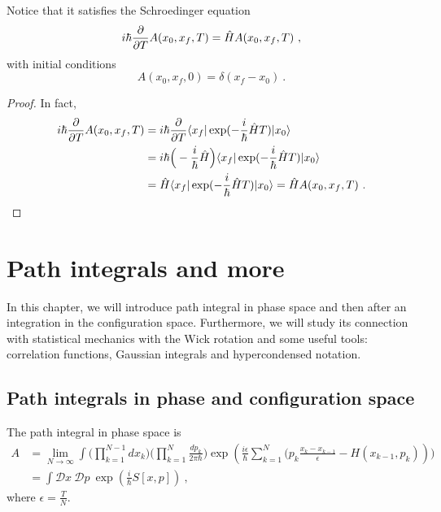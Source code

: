     Notice that it satisfies the Schroedinger equation 
    \begin{equation*}
        i \hbar \frac{\partial}{\partial T} A (x_0, x_f, T) = \hat H A (x_0, x_f, T) ~,
    \end{equation*}
    with initial conditions
    \begin{equation*}
        A (x_0, x_f, 0) = \delta (x_f - x_0) ~.
    \end{equation*}
    \begin{proof}
        In fact,
        \begin{equation*}
        \begin{aligned}
            i \hbar \frac{\partial}{\partial T} A (x_0, x_f, T) & = i \hbar \frac{\partial}{\partial T} \langle x_f\vert \exp(- \frac{i}{\hbar} \hat H T) \vert x_0\rangle \\ & = i \hbar \Big (- \frac{i}{\hbar} \hat H \Big) \langle x_f\vert \exp(- \frac{i}{\hbar} \hat H T) \vert x_0\rangle  \\ & =  \hat H \langle x_f\vert \exp(- \frac{i}{\hbar} \hat H T) \vert x_0\rangle = \hat H  A (x_0, x_f, T) ~.
        \end{aligned}
        \end{equation*}
    \end{proof}

\chapter{Path integrals and more}

    In this chapter, we will introduce path integral in phase space and then after an integration in the configuration space. Furthermore, we will study its connection with statistical mechanics with the Wick rotation and some useful tools: correlation functions, Gaussian integrals and hypercondensed notation.

\section{Path integrals in phase and configuration space}

    The path integral in phase space is 
    \begin{equation*}
    \begin{aligned}
        A & = \lim_{N \rightarrow \infty} \int \Big (\prod_{k=1}^{N-1} d x_k \Big ) \Big (\prod_{k=1}^{N} \frac{d p_k}{2\pi \hbar} \Big ) \exp(\frac{i \epsilon}{\hbar} \sum_{k=1}^{N} \Big (p_k \frac{x_k - x_{k-1}}{\epsilon} - H(x_{k-1}, p_k))) \\ & = \int \mathcal D x ~ \mathcal D p ~ \exp(\frac{i}{\hbar} S[x,p]) ~,
    \end{aligned}
    \end{equation*}
    where $\epsilon =\frac{T}{N} $.

